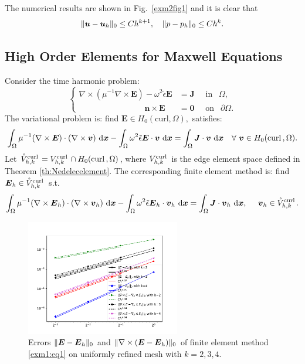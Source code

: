 \documentclass[mathpazo]{cicp}
\begin{document}
The numerical results are shown in Fig.~\ref{exm2fig1} and it is clear that 
$$
\|\boldsymbol u-\boldsymbol u_h\|_{0} \leq C h^{k+1}, \quad \|p - p_h\|_{0} \leq Ch^{k}.
$$

\subsection{High Order Elements for Maxwell Equations}
Consider the time harmonic problem:
$$
\begin{cases}
\nabla \times (\mu^{-1}\nabla \times \boldsymbol E) - \omega^2 \tilde \epsilon
\boldsymbol E & = \boldsymbol J \quad \text{ in } \ \ \Omega,\\
\qquad\qquad\qquad\qquad \boldsymbol n \times \boldsymbol E & = \boldsymbol 0 \quad \text{ on } \ \
\partial \Omega.
\end{cases}
$$
The variational problem is: find $\boldsymbol E \in H_0(\mathrm{curl}, \Omega),$ satisfies:
\begin{align*}
\int_{\Omega}\mu^{-1}(\nabla \times \boldsymbol E)
\cdot (\nabla \times \boldsymbol v) \ \mathrm d\boldsymbol x - 
\int_{\Omega}\omega^2 \tilde 
\epsilon \boldsymbol E \cdot \boldsymbol v\ \mathrm d\boldsymbol x
= \int_{\Omega}\boldsymbol J \cdot \boldsymbol v \ \mathrm d\boldsymbol x \quad  \forall \ \boldsymbol v \in H_0({\rm curl\,}, \Omega).
\end{align*}
Let $\mathring{V}_{h,k}^{{\rm curl\,}} = V_{h,k}^{{\rm curl\,}} \cap H_0({\rm curl\,}, \Omega)$, where 
$V_{h,k}^{{\rm curl\,}} $ is the edge element space defined in Theorem \ref{th:Nedelecelement}. The corresponding finite element method is: find 
$\boldsymbol E_h \in \mathring{V}_{h,k}^{{\rm curl\,}}$ s.t.
\begin{align}
\label{exm1:eq1}
\int_{\Omega}\mu^{-1}(\nabla \times \boldsymbol E_h)
\cdot (\nabla \times \boldsymbol v_h) \ \mathrm d\boldsymbol x -
\int_{\Omega}\omega^2 \tilde
\epsilon \boldsymbol E_h \cdot \boldsymbol v_h\ \mathrm d\boldsymbol x
= \int_{\Omega}\boldsymbol J \cdot \boldsymbol v_h \ \mathrm d\boldsymbol x, \quad \ 
\boldsymbol v_h \in  \mathring{V}_{h,k}^{\curl}.
\end{align} 

\begin{figure}[htp] 
\centering
\includegraphics[width=0.6\textwidth]{figures/Maxwell.pdf}
\caption{Errors $\|\boldsymbol E - \boldsymbol E_h\|_{0}$ and 
    $\|\nabla \times(\boldsymbol E - \boldsymbol E_h)\|_{0}$ of finite element
    method \eqref{exm1:eq1} on uniformly refined mesh with $k = 2, 3, 4$.}
\label{exm1fig1}
\end{figure}
\end{document}

